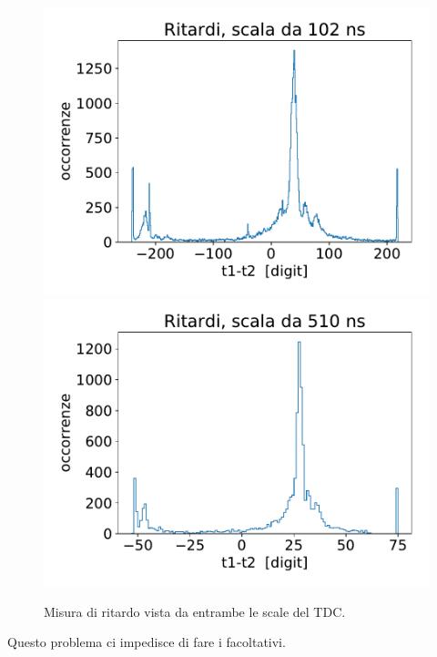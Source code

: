 \begin{figure}[h]
\centering
\subfloat
{\includegraphics[width=18 em]{immagini/100}
}
\subfloat
{\includegraphics[width=18 em]{immagini/500}
}

\caption{Misura di ritardo vista da entrambe le scale del TDC.}
\label{confronto}
\end{figure}

Questo problema ci impedisce di fare i facoltativi.
